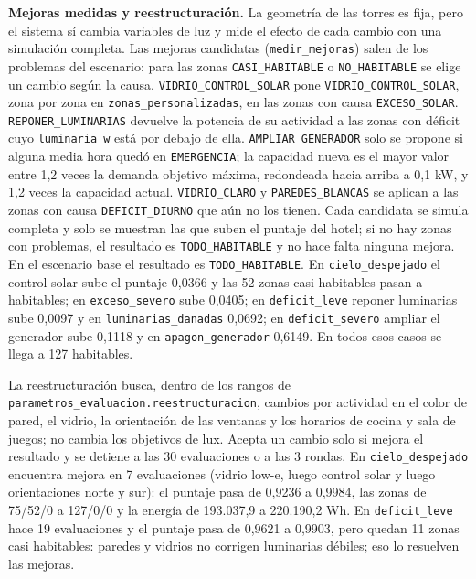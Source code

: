 \documentclass[12pt,a4paper]{article}
\newcommand{\clase}[1]{\texttt{#1}}
\newcommand{\estado}[1]{\texttt{#1}}
\newcommand{\codigo}[1]{\texttt{#1}}
\begin{document}
\textbf{Mejoras medidas y reestructuración.} La geometría de las torres es fija, pero el sistema sí cambia variables de luz y mide el efecto de cada cambio con una simulación completa. Las mejoras candidatas (\codigo{medir\_mejoras}) salen de los problemas del escenario: para las zonas \estado{CASI\_HABITABLE} o \estado{NO\_HABITABLE} se elige un cambio según la causa. \codigo{VIDRIO\_CONTROL\_SOLAR} pone \clase{VIDRIO\_CONTROL\_SOLAR}, zona por zona en \codigo{zonas\_personalizadas}, en las zonas con causa \codigo{EXCESO\_SOLAR}. \codigo{REPONER\_LUMINARIAS} devuelve la potencia de su actividad a las zonas con déficit cuyo \codigo{luminaria\_w} está por debajo de ella. \codigo{AMPLIAR\_GENERADOR} solo se propone si alguna media hora quedó en \estado{EMERGENCIA}; la capacidad nueva es el mayor valor entre 1,2 veces la demanda objetivo máxima, redondeada hacia arriba a 0,1 kW, y 1,2 veces la capacidad actual. \codigo{VIDRIO\_CLARO} y \codigo{PAREDES\_BLANCAS} se aplican a las zonas con causa \codigo{DEFICIT\_DIURNO} que aún no los tienen. Cada candidata se simula completa y solo se muestran las que suben el puntaje del hotel; si no hay zonas con problemas, el resultado es \estado{TODO\_HABITABLE} y no hace falta ninguna mejora. En el escenario base el resultado es \estado{TODO\_HABITABLE}. En \codigo{cielo\_despejado} el control solar sube el puntaje 0,0366 y las 52 zonas casi habitables pasan a habitables; en \codigo{exceso\_severo} sube 0,0405; en \codigo{deficit\_leve} reponer luminarias sube 0,0097 y en \codigo{luminarias\_danadas} 0,0692; en \codigo{deficit\_severo} ampliar el generador sube 0,1118 y en \codigo{apagon\_generador} 0,6149. En todos esos casos se llega a 127 habitables.

La reestructuración busca, dentro de los rangos de \codigo{parametros\_evaluacion.reestructuracion}, cambios por actividad en el color de pared, el vidrio, la orientación de las ventanas y los horarios de cocina y sala de juegos; no cambia los objetivos de lux. Acepta un cambio solo si mejora el resultado y se detiene a las 30 evaluaciones o a las 3 rondas. En \codigo{cielo\_despejado} encuentra mejora en 7 evaluaciones (vidrio low-e, luego control solar y luego orientaciones norte y sur): el puntaje pasa de 0,9236 a 0,9984, las zonas de 75/52/0 a 127/0/0 y la energía de 193.037,9 a 220.190,2 Wh. En \codigo{deficit\_leve} hace 19 evaluaciones y el puntaje pasa de 0,9621 a 0,9903, pero quedan 11 zonas casi habitables: paredes y vidrios no corrigen luminarias débiles; eso lo resuelven las mejoras.
\end{document}
